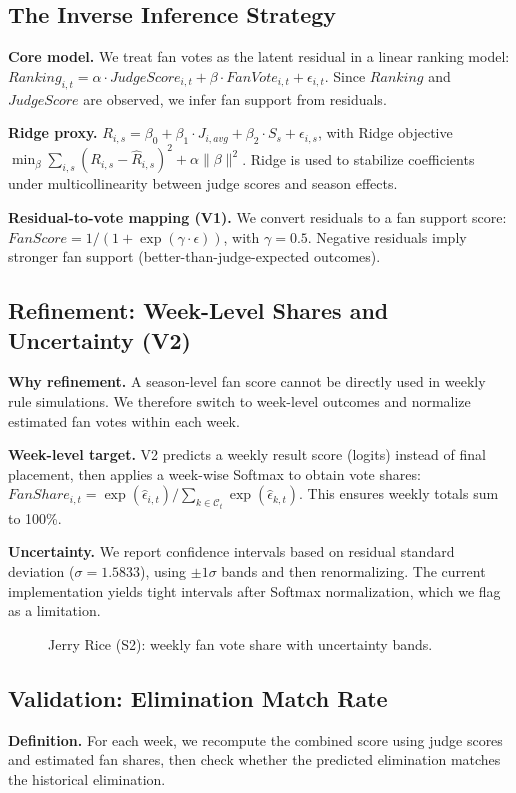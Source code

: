 \documentclass{mcmthesis}
\begin{document}
\subsection{The Inverse Inference Strategy}
\textbf{Core model.} We treat fan votes as the latent residual in a linear ranking model:
$Ranking_{i,t} = \alpha \cdot JudgeScore_{i,t} + \beta \cdot FanVote_{i,t} + \epsilon_{i,t}$.
Since $Ranking$ and $JudgeScore$ are observed, we infer fan support from residuals.

\textbf{Ridge proxy.}
$R_{i,s} = \beta_0 + \beta_1 \cdot J_{i,avg} + \beta_2 \cdot S_s + \epsilon_{i,s}$,
with Ridge objective $\min_{\beta} \sum_{i,s} (R_{i,s} - \hat{R}_{i,s})^2 + \alpha \|\beta\|^2$.
Ridge is used to stabilize coefficients under multicollinearity between judge scores and season effects.

\textbf{Residual-to-vote mapping (V1).} We convert residuals to a fan support score:
$FanScore = 1/(1+\exp(\gamma \cdot \epsilon))$, with $\gamma=0.5$.
Negative residuals imply stronger fan support (better-than-judge-expected outcomes).

\subsection{Refinement: Week-Level Shares and Uncertainty (V2)}
\textbf{Why refinement.} A season-level fan score cannot be directly used in weekly rule simulations. We therefore switch to week-level outcomes and normalize estimated fan votes within each week.

\textbf{Week-level target.} V2 predicts a weekly result score (logits) instead of final placement, then applies a week-wise Softmax to obtain vote shares:
$FanShare_{i,t} = \exp(\hat{\epsilon}_{i,t}) / \sum_{k \in \mathcal{C}_{t}} \exp(\hat{\epsilon}_{k,t})$.
This ensures weekly totals sum to 100\%.

\textbf{Uncertainty.} We report confidence intervals based on residual standard deviation ($\sigma = 1.5833$), using $\pm 1\sigma$ bands and then renormalizing. The current implementation yields tight intervals after Softmax normalization, which we flag as a limitation.

\begin{figure}[htbp]
\centering
\caption{Jerry Rice (S2): weekly fan vote share with uncertainty bands.}
\end{figure}

\subsection{Validation: Elimination Match Rate}
\textbf{Definition.} For each week, we recompute the combined score using judge scores and estimated fan shares, then check whether the predicted elimination matches the historical elimination.
\end{document}
